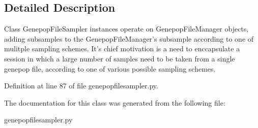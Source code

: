 \subsection{Detailed Description}
\begin{DoxyVerb}Class GenepopFileSampler instances operate on GenepopFileManager objects,
adding subsamples to the GenepopFileManager's subsample according to one of
mulitple sampling schemes.  It's chief motivation is a need to enccapsulate 
a session in which a large number of samples need to be taken from a single
genepop file, according to one of various possible sampling schemes.
\end{DoxyVerb}
 

Definition at line 87 of file genepopfilesampler.\+py.



The documentation for this class was generated from the following file\+:\begin{DoxyCompactItemize}
\item 
genepopfilesampler.\+py\end{DoxyCompactItemize}

